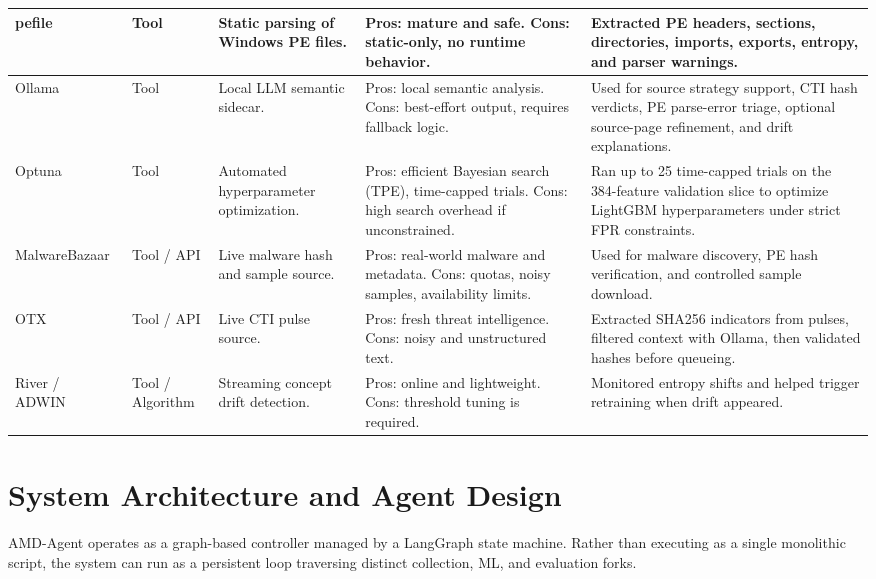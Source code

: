 \documentclass[letterpaper,10pt,conference]{ieeeconf}
\begin{document}
\begin{table}[htbp]
\begin{tabular}{|>{\raggedright\arraybackslash}p{1.9cm}|>{\raggedright\arraybackslash}p{1.7cm}|>{\raggedright\arraybackslash}p{3.0cm}|>{\raggedright\arraybackslash}p{3.4cm}|>{\raggedright\arraybackslash}p{4.6cm}|}
pefile~\cite{pefile} & Tool &
Static parsing of Windows PE files. &
Pros: mature and safe. Cons: static-only, no runtime behavior. &
Extracted PE headers, sections, directories, imports, exports, entropy, and parser warnings. \\
\hline

Ollama~\cite{ollama} & Tool &
Local LLM semantic sidecar. &
Pros: local semantic analysis. Cons: best-effort output, requires fallback logic. &
Used for source strategy support, CTI hash verdicts, PE parse-error triage, optional source-page refinement, and drift explanations. \\
\hline

Optuna~\cite{akiba2019optuna} & Tool &
Automated hyperparameter optimization. &
Pros: efficient Bayesian search (TPE), time-capped trials. Cons: high search overhead if unconstrained. &
Ran up to 25 time-capped trials on the 384-feature validation slice to optimize LightGBM hyperparameters under strict FPR constraints. \\
\hline

MalwareBazaar~\cite{malwarebazaar} & Tool / API &
Live malware hash and sample source. &
Pros: real-world malware and metadata. Cons: quotas, noisy samples, availability limits. &
Used for malware discovery, PE hash verification, and controlled sample download. \\
\hline

OTX~\cite{otx} & Tool / API &
Live CTI pulse source. &
Pros: fresh threat intelligence. Cons: noisy and unstructured text. &
Extracted SHA256 indicators from pulses, filtered context with Ollama, then validated hashes before queueing. \\
\hline

River / ADWIN~\cite{riveradwin} & Tool / Algorithm &
Streaming concept drift detection. &
Pros: online and lightweight. Cons: threshold tuning is required. &
Monitored entropy shifts and helped trigger retraining when drift appeared. \\
\hline

\end{tabular}
\end{table}

\section{System Architecture and Agent Design}
AMD-Agent operates as a graph-based controller managed by a LangGraph state machine. Rather than executing as a single monolithic script, the system can run as a persistent loop traversing distinct collection, ML, and evaluation forks.
\end{document}
